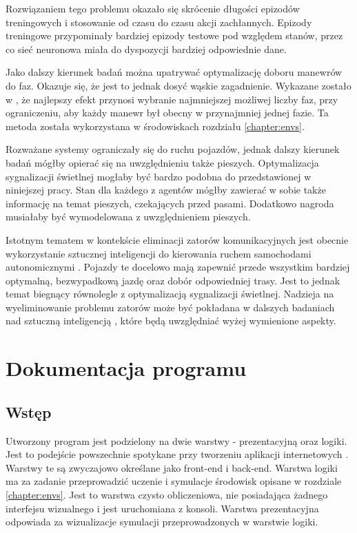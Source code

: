 \documentclass[12pt]{book}
\theoremstyle{plain}
\begin{document}
Rozwiązaniem tego problemu okazało się skrócenie długości epizodów treningowych i stosowanie od czasu do czasu akcji zachłannych. Epizody treningowe przypominały bardziej epizody testowe pod względem stanów, przez co sieć neuronowa miała do dyspozycji bardziej odpowiednie dane.

Jako dalszy kierunek badań można upatrywać optymalizację doboru manewrów do faz.
Okazuje się, że jest to jednak dosyć wąskie zagadnienie.   Wykazane zostało w \cite{gottlich}, że najlepszy efekt przynosi wybranie najmniejszej możliwej liczby faz,  przy ograniczeniu, aby każdy manewr był obecny w przynajmniej jednej fazie. Ta metoda została wykorzystana w środowiskach rozdziału \ref{chapter:envs}.

Rozważane systemy ograniczały się do  ruchu pojazdów, jednak dalszy kierunek badań mógłby opierać się na uwzględnieniu także pieszych. Optymalizacja sygnalizacji świetlnej mogłaby być bardzo podobna do przedstawionej w niniejszej pracy. Stan dla każdego z agentów mógłby zawierać w sobie także informację na temat pieszych, czekających przed pasami. Dodatkowo nagroda musiałaby być wymodelowana z uwzględnieniem pieszych. 

Istotnym  tematem w kontekście eliminacji zatorów komunikacyjnych jest  obecnie  wykorzystanie sztucznej inteligencji  do kierowania ruchem  samochodami autonomicznymi .  Pojazdy te docelowo mają zapewnić przede wszystkim bardziej optymalną, bezwypadkową jazdę oraz dobór odpowiedniej trasy. Jest to jednak temat biegnący równolegle z optymalizacją sygnalizacji świetlnej.  Nadzieja na wyeliminowanie problemu zatorów może być pokładana w  dalszych badaniach nad sztuczną inteligencją ,  które będą uwzględniać  wyżej wymienione  aspekty.




\chapter{Dokumentacja programu} \label{chapter:docs}
\section{Wstęp}
Utworzony program jest podzielony na dwie warstwy - prezentacyjną oraz logiki. Jest to podejście powszechnie spotykane przy tworzeniu aplikacji internetowych \cite{frontend_backend}. Warstwy te są zwyczajowo określane jako front-end i back-end. Warstwa logiki ma za zadanie przeprowadzić uczenie i symulacje środowisk opisane w rozdziale \ref{chapter:envs}. Jest to warstwa czysto obliczeniowa, nie posiadająca żadnego interfejsu wizualnego i jest uruchomiana z konsoli. Warstwa prezentacyjna odpowiada za wizualizacje symulacji przeprowadzonych w warstwie logiki.
\end{document}
